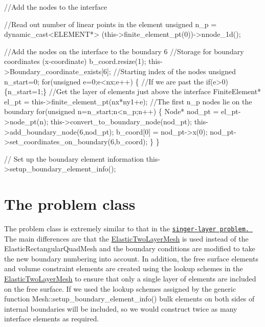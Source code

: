  
\begin{DoxyCodeInclude}
   \textcolor{comment}{//Add the nodes to the interface}

   \textcolor{comment}{//Read out number of linear points in the element}
   \textcolor{keywordtype}{unsigned} n\_p = \textcolor{keyword}{dynamic\_cast<}ELEMENT*\textcolor{keyword}{>}
    (this->finite\_element\_pt(0))->nnode\_1d();
   
   \textcolor{comment}{//Add the nodes on the interface to the boundary 6}
   \textcolor{comment}{//Storage for boundary coordinates (x-coordinate)}
   b\_coord.resize(1);
   this->Boundary\_coordinate\_exists[6];
   \textcolor{comment}{//Starting index of the nodes}
   \textcolor{keywordtype}{unsigned} n\_start=0;
   \textcolor{keywordflow}{for}(\textcolor{keywordtype}{unsigned} e=0;e<nx;e++)
    \{
     \textcolor{comment}{//If we are past the }
     \textcolor{keywordflow}{if}(e>0) \{n\_start=1;\}
     \textcolor{comment}{//Get the layer of elements just above the interface}
     FiniteElement* el\_pt = this->finite\_element\_pt(nx*ny1+e);
     \textcolor{comment}{//The first n\_p nodes lie on the boundary}
     \textcolor{keywordflow}{for}(\textcolor{keywordtype}{unsigned} n=n\_start;n<n\_p;n++)
      \{
       Node* nod\_pt = el\_pt->node\_pt(n);
       this->convert\_to\_boundary\_node(nod\_pt);
       this->add\_boundary\_node(6,nod\_pt);
       b\_coord[0] = nod\_pt->x(0);
       nod\_pt->set\_coordinates\_on\_boundary(6,b\_coord);
      \}
    \}

   \textcolor{comment}{// Set up the boundary element information}
   this->setup\_boundary\_element\_info();

\end{DoxyCodeInclude}
\hypertarget{index_problem}{}\section{The problem class}\label{index_problem}
The problem class is extremely similar to that in the \href{../../static_single_layer/html/index.html}{\tt singer-\/layer problem. } The main differences are that the {\ttfamily \hyperlink{classElasticTwoLayerMesh}{Elastic\+Two\+Layer\+Mesh}} is used instead of the {\ttfamily Elastic\+Rectangular\+Quad\+Mesh} and the boundary conditions are modified to take the new boundary numbering into account. In addition, the free surface elements and volume constraint elements are created using the lookup schemes in the {\ttfamily \hyperlink{classElasticTwoLayerMesh}{Elastic\+Two\+Layer\+Mesh}} to ensure that only a single layer of elements are included on the free surface. If we used the lookup schemes assigned by the generic function {\ttfamily Mesh\+::setup\+\_\+boundary\+\_\+element\+\_\+info()} bulk elements on both sides of internal boundaries will be included, so we would construct twice as many interface elements as required. 

